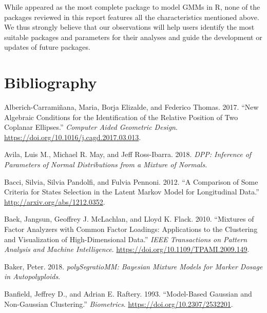 While  appeared as the most complete package to model GMMs in R, none of the packages reviewed in this report features all the characteristics mentioned above.
We thus strongly believe that our observations will help users identify the most suitable packages and parameters for their analyses and guide the development or updates of future packages.

\hypertarget{bibliography}{%
\section{Bibliography}\label{bibliography}}

\hypertarget{refs}{}
\begin{CSLReferences}{1}{0}
\leavevmode{}%
Alberich-Carramiñana, Maria, Borja Elizalde, and Federico Thomas. 2017. {``New Algebraic Conditions for the Identification of the Relative Position of Two Coplanar Ellipses.''} \emph{Computer Aided Geometric Design}. \url{https://doi.org/10.1016/j.cagd.2017.03.013}.

\leavevmode{}%
Avila, Luis M., Michael R. May, and Jeff Ross-Ibarra. 2018. \emph{DPP: Inference of Parameters of Normal Distributions from a Mixture of Normals}.

\leavevmode{}%
Bacci, Silvia, Silvia Pandolfi, and Fulvia Pennoni. 2012. {``A Comparison of Some Criteria for States Selection in the Latent {Markov} Model for Longitudinal Data.''} \url{http://arxiv.org/abs/1212.0352}.

\leavevmode{}%
Baek, Jangsun, Geoffrey J. McLachlan, and Lloyd K. Flack. 2010. {``Mixtures of {Factor} {Analyzers} with {Common} {Factor} {Loadings}: {Applications} to the {Clustering} and {Visualization} of {High}-{Dimensional} {Data}.''} \emph{IEEE Transactions on Pattern Analysis and Machine Intelligence}. \url{https://doi.org/10.1109/TPAMI.2009.149}.

\leavevmode{}%
Baker, Peter. 2018. \emph{polySegratioMM: Bayesian Mixture Models for Marker Dosage in Autopolyploids}.

\leavevmode{}%
Banfield, Jeffrey D., and Adrian E. Raftery. 1993. {``Model-{Based Gaussian} and {Non-Gaussian Clustering}.''} \emph{Biometrics}. \url{https://doi.org/10.2307/2532201}.


\end{CSLReferences}
